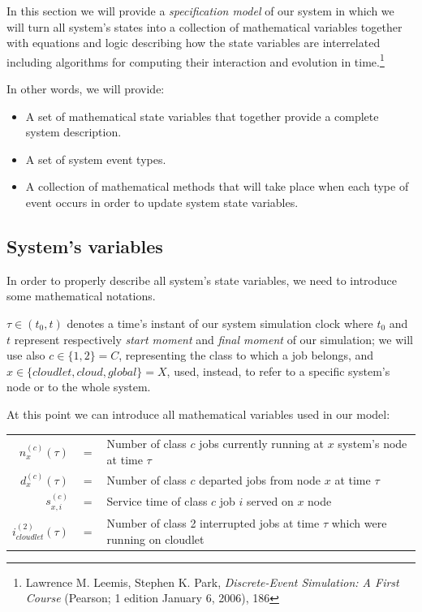 \documentclass[10pt,a4paper]{article}
\begin{document}
In this section we will provide a \textit{specification model} of our system in which we will turn all system's states into a collection of mathematical variables together with equations and logic describing how the state variables are interrelated including algorithms for computing their interaction and evolution in time.\footnote{Lawrence M. Leemis, Stephen K. Park, \textit{Discrete-Event Simulation: A First Course} (Pearson; 1 edition January 6, 2006), 186}

In other words, we will provide:

\begin{itemize}
\item A set of mathematical state variables that together provide a complete system description.
\item A set of system event types.
\item A collection of mathematical methods that will take place when each type of event occurs in order to update system state variables.
\end{itemize}

\subsection{System's variables}

In order to properly describe all system's state variables, we need to introduce some mathematical notations.

$\tau \in (t_0, t)$ denotes a time's instant of our system simulation clock where $t_0$ and $t$ represent respectively \textit{start moment} and \textit{final moment} of our simulation; we will use also $c \in \lbrace 1,2 \rbrace = C$, representing the class to which a job belongs, and $x \in \lbrace cloudlet,cloud,global \rbrace = X$, used, instead, to refer to a specific system's node or to the whole system.

At this point we can introduce all mathematical variables used in our model:

\begin{table}[h!]
    \centering
    \small
    \begin{tabular}{rcl}
       
      $n_x^{(c)}(\tau)$ & $ = $ & Number of class $c$ jobs currently running at $x$ system's node at time $\tau$ \\
      $d_x^{(c)}(\tau)$ & $ = $ & Number of class $c$ departed jobs from node $x$ at time $\tau$ \\
      $s_{x,i}^{(c)}$ & $ = $ & Service time of class $c$ job $i$ served on $x$ node   \\
      $i_{cloudlet}^{(2)}(\tau)$ & $ = $ & Number of class 2 interrupted jobs at time $\tau$ which were running on cloudlet\\
          
    \end{tabular}
\end{table}
\end{document}

